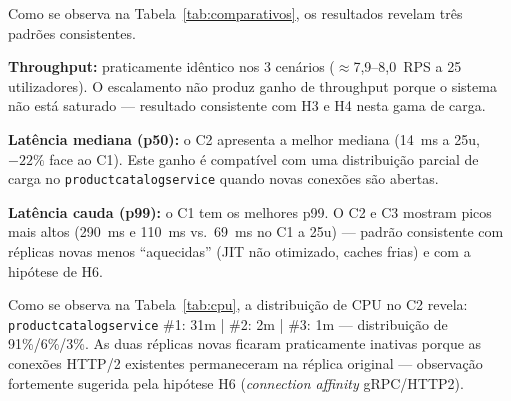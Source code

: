 \documentclass[acmsmall,screen=true,nonacm]{acmart}
\begin{document}
Como se observa na Tabela~\ref{tab:comparativos}, os resultados revelam três padrões consistentes.

\textbf{Throughput:} praticamente idêntico nos 3 cenários ($\approx$7,9--8,0~RPS a 25 utilizadores). O escalamento não produz ganho de throughput porque o sistema não está saturado — resultado consistente com H3 e H4 nesta gama de carga.

\textbf{Latência mediana (p50):} o C2 apresenta a melhor mediana (14~ms a 25u, $-22\%$ face ao C1). Este ganho é compatível com uma distribuição parcial de carga no \texttt{productcatalogservice} quando novas conexões são abertas.

\textbf{Latência cauda (p99):} o C1 tem os melhores p99. O C2 e C3 mostram picos mais altos (290~ms e 110~ms vs.\ 69~ms no C1 a 25u) — padrão consistente com réplicas novas menos ``aquecidas'' (JIT não otimizado, caches frias) e com a hipótese de H6.

Como se observa na Tabela~\ref{tab:cpu}, a distribuição de CPU no C2 revela: \texttt{productcatalogservice} \#1: 31m | \#2: 2m | \#3: 1m — distribuição de 91\%/6\%/3\%. As duas réplicas novas ficaram praticamente inativas porque as conexões HTTP/2 existentes permaneceram na réplica original — observação fortemente sugerida pela hipótese H6 (\textit{connection affinity} gRPC/HTTP2).

\begin{table}[h]
\caption{Distribuição de CPU por serviço e por réplica nos três cenários a 25 utilizadores (valores \texttt{kubectl top}, em millicores). Evidencia a \textit{connection affinity} gRPC (H6): réplicas novas ficam subutilizadas enquanto a original acumula carga.}
\label{tab:cpu}
\end{table}
\end{document}
